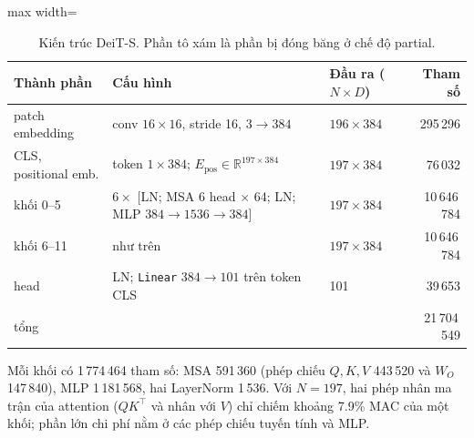 \begin{table}[htbp]
\centering
\caption{Kiến trúc DeiT-S. Phần tô xám là phần bị đóng băng ở chế độ partial.}
\label{tab:a1-deit}
\small
\begin{adjustbox}{max width=\linewidth}
\begin{tabular}{lllr}
\toprule
Thành phần & Cấu hình & Đầu ra (\(N\times D\)) & Tham số \\
\midrule
\rowcolor{black!8} patch embedding & conv \(16\times16\), stride 16, \(3\to384\) & \(196\times384\) & 295\,296 \\
\rowcolor{black!8} CLS, positional emb. & token \(1\times384\); \(E_{\mathrm{pos}}\in\mathbb{R}^{197\times384}\) & \(197\times384\) & 76\,032 \\
\rowcolor{black!8} khối 0--5 & \(6\times\) [LN; MSA 6 head \(\times\) 64; LN; MLP \(384\to1536\to384\)] & \(197\times384\) & 10\,646\,784 \\
khối 6--11 & như trên & \(197\times384\) & 10\,646\,784 \\
head & LN; \texttt{Linear} \(384\to101\) trên token CLS & 101 & 39\,653 \\
\midrule
tổng & & & 21\,704\,549 \\
\bottomrule
\end{tabular}
\end{adjustbox}
\end{table}

Mỗi khối có 1\,774\,464 tham số: MSA 591\,360 (phép chiếu \(Q,K,V\) 443\,520 và \(W_O\) 147\,840), MLP 1\,181\,568, hai LayerNorm 1\,536. Với \(N=197\), hai phép nhân ma trận của attention (\(QK^{\top}\) và nhân với \(V\)) chỉ chiếm khoảng 7.9\% MAC của một khối; phần lớn chi phí nằm ở các phép chiếu tuyến tính và MLP.

